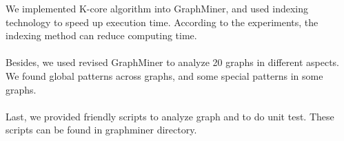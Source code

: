 We implemented K-core algorithm into GraphMiner, and used indexing technology to speed up execution time. According to the experiments, the indexing method can  reduce computing time.
\\
\\
Besides, we used revised GraphMiner to analyze 20 graphs in different aspects. We found global patterns across  graphs, and some special patterns in some graphs.
\\
\\
Last, we provided friendly scripts to analyze graph and to do unit test. These scripts can be found in graphminer directory.